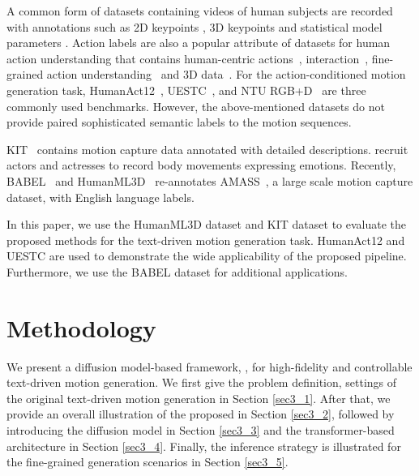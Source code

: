 A common form of datasets containing videos of human subjects are recorded with annotations such as 2D keypoints \citep{jhuang2013towards, andriluka2018posetrack}, 3D keypoints \citep{ionescu2013human3, joo2015panoptic, mehta2017monocular, trumble2017total, li2021ai} and statistical model parameters \citep{Yu2020HUMBIAL, patel2021agora, cao2020long, cai2021playing, cai2022humman}. Action labels are also a popular attribute of datasets for human action understanding that contains human-centric actions~\citep{kuehne2011hmdb, soomro2012ucf101, karpathy2014large, gu2018ava, shao2020finegym, chung2021haa500}, interaction~\citep{carreira2019short, monfort2019moments, zhao2019hacs}, fine-grained action understanding~\citep{gu2018ava, shao2020finegym, chung2021haa500} and 3D data~\citep{liu2019ntu}. For the action-conditioned motion generation task, HumanAct12~\citep{guo2020action2motion}, UESTC~\citep{ji2018large}, and NTU RGB+D~\citep{liu2019ntu} are three commonly used benchmarks. However, the above-mentioned datasets do not provide paired sophisticated semantic labels to the motion sequences.

KIT~\citep{plappert2016kit} contains motion capture data annotated with detailed descriptions. \cite{zhang2020kinematic} recruit actors and actresses to record body movements expressing emotions. Recently, BABEL~\citep{punnakkal2021babel} and HumanML3D~\citep{guo2022generating} re-annotates AMASS~\citep{mahmood2019amass}, a large scale motion capture dataset, with English language labels.

In this paper, we use the HumanML3D dataset and KIT dataset to evaluate the proposed methods for the text-driven motion generation task. HumanAct12 and UESTC are used to demonstrate the wide applicability of the proposed pipeline. Furthermore, we use the BABEL dataset for additional applications.


\section{Methodology}\label{sec3}

We present a diffusion model-based framework, \textbf{\name}, for high-fidelity and controllable text-driven motion generation. We first give the problem definition, settings of the original text-driven motion generation in Section \ref{sec3_1}. After that, we provide an overall illustration of the proposed \name in Section \ref{sec3_2}, followed by introducing the diffusion model in Section \ref{sec3_3} and the transformer-based architecture in Section \ref{sec3_4}. Finally, the inference strategy is illustrated for the fine-grained generation scenarios in Section \ref{sec3_5}.

